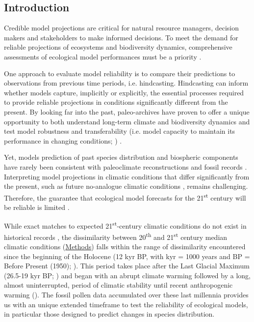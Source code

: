 \rmfamily

\newpage

\subsection{Introduction}\label{intro2}

Credible model projections are critical for natural resource managers, decision makers and stakeholders to make informed decisions. To meet the demand for reliable projections of ecosystems and biodiversity dynamics, comprehensive assessments  of ecological model performances must be a priority \citep{Dawson2011, Mouquet2015, Pacifici2015}. 

One approach to evaluate model reliability is to compare their predictions to observations from previous time periods, i.e. hindcasting. Hindcasting can inform whether models capture, implicitly or explicitly, the essential processes required to provide reliable projections in conditions significantly different from the present. By looking far into the past, paleo-archives have proven to offer a unique opportunity to both understand long-term climate and biodiversity dynamics \citep{Bartlein2011, Fordham2020} and test model robustness and transferability (i.e. model capacity to maintain its performance in changing conditions; \citealp{UribeRivera2023}) \citep{Braconnot2012, Maguire2015}.  

Yet, models prediction of past species distribution and biospheric components have rarely been consistent with paleoclimate reconstructions and fossil records \citep{Veloz2012, Pearman2008b, Roberts2012, Foley2013, Maguire2016}. Interpreting model projections in climatic conditions that differ significantly from the present, such as future no-analogue climatic conditions \citep{Williams2007}, remains challenging. Therefore, the guarantee that ecological model forecasts for the 21\textsuperscript{st} century will be reliable is limited \citep{Fitzpatrick2018}. 

While exact matches to expected 21\textsuperscript{st}-century climatic conditions do not exist in historical records \citep{Burke2018}, the dissimilarity between 20\textsuperscript{th} and 21\textsuperscript{st} century median climatic conditions (\hyperref[methods2]{Methods}) falls within the range of dissimilarity encountered since the beginning of the Holocene (12 kyr BP, with kyr = 1000 years and BP = Before Present (1950); ). This period takes place after the Last Glacial Maximum (26.5-19 kyr BP; \citealp{Clark2009}) and began with an abrupt climate warming followed by a long, almost uninterrupted, period of climatic stability until recent anthropogenic warming (). The fossil pollen data accumulated over these last millennia provides us with an unique extended timeframe to test the reliability of ecological models, in particular those designed to predict changes in species distribution.

